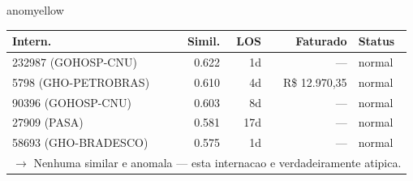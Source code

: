 \documentclass[a4paper,10pt]{article}
\begin{document}
\begin{anomalycard}[Internacao 698 | GHO-COPEL | MODERADO (z=2.69)]{anomyellow}
\begin{tabular}{l r r r l}\toprule\textbf{Intern.} & \textbf{Simil.} & \textbf{LOS} & \textbf{Faturado} & \textbf{Status} \\\midrule
232987 (GOHOSP-CNU) & 0.622 & 1d & --- & \textcolor{jcubeblue}{normal} \\
5798 (GHO-PETROBRAS) & 0.610 & 4d & R\$ 12.970,35 & \textcolor{jcubeblue}{normal} \\
90396 (GOHOSP-CNU) & 0.603 & 8d & --- & \textcolor{jcubeblue}{normal} \\
27909 (PASA) & 0.581 & 17d & --- & \textcolor{jcubeblue}{normal} \\
58693 (GHO-BRADESCO) & 0.575 & 1d & --- & \textcolor{jcubeblue}{normal} \\
\multicolumn{5}{l}{\textcolor{jcubeblue}{\small $\rightarrow$ Nenhuma similar e anomala --- esta internacao e verdadeiramente atipica.}} \\
\bottomrule\end{tabular}


\end{anomalycard}

\newpage
\end{document}
